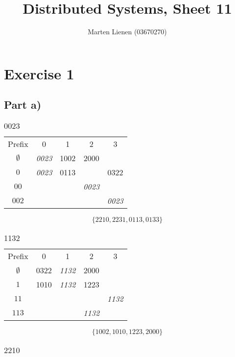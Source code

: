 \documentclass[10pt,a4paper]{article}
\title{Distributed Systems, Sheet 11}
\author{Marten Lienen (03670270)}
\begin{document}
\maketitle

\section*{Exercise 1}

\subsection*{Part a)}

\subsubsection*{$0023$}

\begin{tabular}{c|cccc}
  Prefix & 0 & 1 & 2 & 3\\
  $\emptyset$ & \emph{0023} & 1002 & 2000 & \\
  $0$ & \emph{0023} & 0113 &  & 0322\\
  $00$ &  &  & \emph{0023} & \\
  $002$ &  &  &  & \emph{0023}\\
\end{tabular}

\begin{equation*}
  \{ 2210, 2231, 0113, 0133 \}
\end{equation*}

\subsubsection*{$1132$}

\begin{tabular}{c|cccc}
  Prefix & 0 & 1 & 2 & 3\\
  $\emptyset$ & 0322 & \emph{1132} & 2000 & \\
  $1$ & 1010 & \emph{1132} & 1223 & \\
  $11$ &  &  &  & \emph{1132}\\
  $113$ &  &  & \emph{1132} & \\
\end{tabular}

\begin{equation*}
  \{ 1002, 1010, 1223, 2000 \}
\end{equation*}

\subsubsection*{$2210$}
\end{document}
